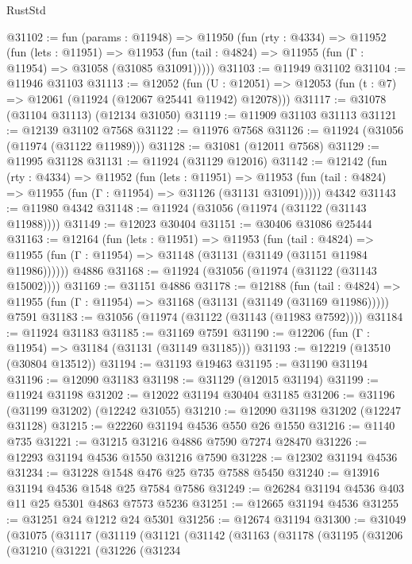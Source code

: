 \begin{lexlean}{RustStd}
\begin{coremodule}
@31102 := fun (params : @11948) =>
  @11950
    (fun (rty : @4334) =>
    @11952
      (fun (lets : @11951) =>
      @11953 (fun (tail : @4824) => @11955 (fun (Γ : @11954) => @31058 (@31085 @31091)))))
@31103 := @11949 @31102
@31104 := @11946 @31103
@31113 := @12052
    (fun (U : @12051) => @12053 (fun (t : @7) => @12061 (@11924 (@12067 @25441 @11942) @12078)))
@31117 := @31078 (@31104 @31113) (@12134 @31050)
@31119 := @11909 @31103 @31113
@31121 := @12139 @31102 @7568
@31122 := @11976 @7568
@31126 := @11924 (@31056 (@11974 (@31122 @11989)))
@31128 := @31081 (@12011 @7568)
@31129 := @11995 @31128
@31131 := @11924 (@31129 @12016)
@31142 := @12142
    (fun (rty : @4334) =>
    @11952
      (fun (lets : @11951) =>
      @11953 (fun (tail : @4824) => @11955 (fun (Γ : @11954) => @31126 (@31131 @31091)))))
    @4342
@31143 := @11980 @4342
@31148 := @11924 (@31056 (@11974 (@31122 (@31143 @11988))))
@31149 := @12023 @30404
@31151 := @30406 @31086 @25444
@31163 := @12164
    (fun (lets : @11951) =>
    @11953
      (fun (tail : @4824) =>
      @11955 (fun (Γ : @11954) => @31148 (@31131 (@31149 (@31151 @11984 @11986))))))
    @4886
@31168 := @11924 (@31056 (@11974 (@31122 (@31143 @15002))))
@31169 := @31151 @4886
@31178 := @12188
    (fun (tail : @4824) => @11955 (fun (Γ : @11954) => @31168 (@31131 (@31149 (@31169 @11986)))))
    @7591
@31183 := @31056 (@11974 (@31122 (@31143 (@11983 @7592))))
@31184 := @11924 @31183
@31185 := @31169 @7591
@31190 := @12206 (fun (Γ : @11954) => @31184 (@31131 (@31149 @31185)))
@31193 := @12219 (@13510 (@30804 @13512))
@31194 := @31193 @19463
@31195 := @31190 @31194
@31196 := @12090 @31183
@31198 := @31129 (@12015 @31194)
@31199 := @11924 @31198
@31202 := @12022 @31194 @30404 @31185
@31206 := @31196 (@31199 @31202) (@12242 @31055)
@31210 := @12090 @31198 @31202 (@12247 @31128)
@31215 := @22260 @31194 @4536 @550 @26 @1550
@31216 := @1140 @735
@31221 := @31215 @31216 @4886 @7590 @7274 @28470
@31226 := @12293 @31194 @4536 @1550 @31216 @7590
@31228 := @12302 @31194 @4536
@31234 := @31228 @1548 @476 @25 @735 @7588 @5450
@31240 := @13916 @31194 @4536 @1548 @25 @7584 @7586
@31249 := @26284 @31194 @4536 @403 @11 @25 @5301 @4863 @7573 @5236
@31251 := @12665 @31194 @4536
@31255 := @31251 @24 @1212 @24 @5301
@31256 := @12674 @31194
@31300 := @31049
    (@31075
      (@31117
        (@31119
          (@31121
            (@31142
              (@31163
                (@31178
                  (@31195
                    (@31206
                      (@31210
                        (@31221
                          (@31226
                            (@31234

\end{coremodule}
\end{lexlean}
